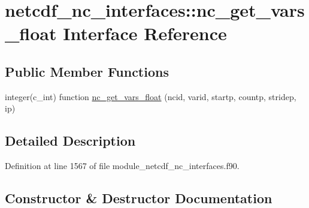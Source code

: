 \hypertarget{interfacenetcdf__nc__interfaces_1_1nc__get__vars__float}{}\section{netcdf\+\_\+nc\+\_\+interfaces\+:\+:nc\+\_\+get\+\_\+vars\+\_\+float Interface Reference}
\label{interfacenetcdf__nc__interfaces_1_1nc__get__vars__float}
\subsection*{Public Member Functions}
\begin{DoxyCompactItemize}
\item 
integer(c\+\_\+int) function \hyperlink{interfacenetcdf__nc__interfaces_1_1nc__get__vars__float_a4f6cefb155f04f105c68f2f6af92b7cc}{nc\+\_\+get\+\_\+vars\+\_\+float} (ncid, varid, startp, countp, stridep, ip)
\end{DoxyCompactItemize}


\subsection{Detailed Description}


Definition at line 1567 of file module\+\_\+netcdf\+\_\+nc\+\_\+interfaces.\+f90.



\subsection{Constructor \& Destructor Documentation}
\mbox{\label{interfacenetcdf__nc__interfaces_1_1nc__get__vars__float_a4f6cefb155f04f105c68f2f6af92b7cc}} 
